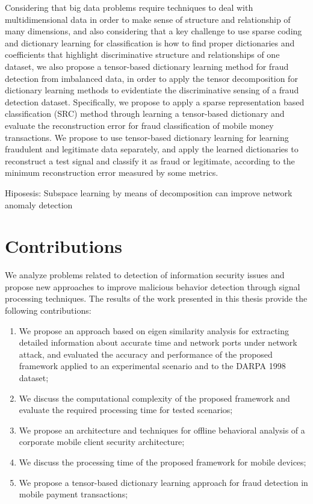 Considering that big data problems require techniques to deal with multidimensional data in order to make sense of structure and relationship of many dimensions, and also considering that a key challenge to use sparse coding and dictionary learning for classification is how to find proper dictionaries and coefficients that highlight discriminative structure and relationships of one dataset, we also propose a tensor-based dictionary learning method for fraud detection from imbalanced data, in order to apply the tensor decomposition for dictionary learning methods to evidentiate the discriminative sensing of a fraud detection dataset. Specifically, we propose to apply a sparse representation based classification (SRC) method through learning a tensor-based dictionary and evaluate the reconstruction error for fraud classification of mobile money transactions. We propose to use tensor-based dictionary learning for learning fraudulent and legitimate data separately, and apply the learned dictionaries to reconstruct a test signal and classify it as fraud or legitimate, according to the minimum reconstruction error measured by some metrics.

Hiposesis: Subspace learning by means of decomposition can improve network anomaly detection

\section{Contributions}
\label{sc:contributions}

We analyze problems related to detection of information security issues and propose new approaches to improve malicious behavior detection through signal processing techniques. The results of the work presented in this thesis provide the following contributions:

\begin{enumerate}
	\item We propose an approach based on eigen similarity analysis for extracting detailed information about accurate time and network ports under network attack, and evaluated the accuracy and performance of the proposed framework applied to an experimental scenario and to the DARPA 1998 dataset;
	\item We discuss the computational complexity of the proposed framework and evaluate the required processing time for tested scenarios;
	\item We propose an architecture and techniques for offline behavioral analysis of a corporate mobile client security architecture;
	\item We discuss the processing time of the proposed framework for mobile devices;
	\item We propose a tensor-based dictionary learning approach for fraud detection in mobile payment transactions;
\end{enumerate}

